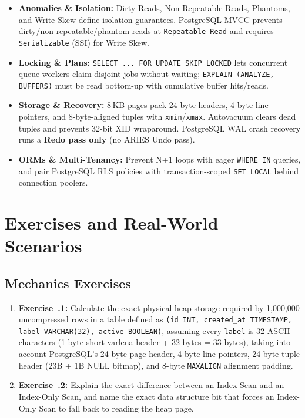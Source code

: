\begin{itemize}[leftmargin=15pt]
  \item \textbf{Anomalies \& Isolation:} Dirty Reads, Non-Repeatable Reads, Phantoms, and Write Skew define isolation guarantees. PostgreSQL MVCC prevents dirty/non-repeatable/phantom reads at \texttt{Repeatable Read} and requires \texttt{Serializable} (SSI) for Write Skew.
  \item \textbf{Locking \& Plans:} \texttt{SELECT ... FOR UPDATE SKIP LOCKED} lets concurrent queue workers claim disjoint jobs without waiting; \texttt{EXPLAIN (ANALYZE, BUFFERS)} must be read bottom-up with cumulative buffer hits/reads.
  \item \textbf{Storage \& Recovery:} 8\,KB pages pack 24-byte headers, 4-byte line pointers, and 8-byte-aligned tuples with \texttt{xmin}/\texttt{xmax}. Autovacuum clears dead tuples and prevents 32-bit XID wraparound. PostgreSQL WAL crash recovery runs a \textbf{Redo pass only} (no ARIES Undo pass).
  \item \textbf{ORMs \& Multi-Tenancy:} Prevent N+1 loops with eager \texttt{WHERE IN} queries, and pair PostgreSQL RLS policies with transaction-scoped \texttt{SET LOCAL} behind connection poolers.
\end{itemize}

\section{Exercises and Real-World Scenarios}

\subsection{Mechanics Exercises}
\begin{enumerate}[leftmargin=15pt]
  \item \textbf{Exercise~\thechapter.1:} Calculate the exact physical heap storage required by 1,000,000 uncompressed rows in a table defined as \texttt{(id INT, created\_at TIMESTAMP, label VARCHAR(32), active BOOLEAN)}, assuming every \texttt{label} is 32 ASCII characters (1-byte short varlena header + 32 bytes = 33 bytes), taking into account PostgreSQL's 24-byte page header, 4-byte line pointers, 24-byte tuple header (23B + 1B NULL bitmap), and 8-byte \texttt{MAXALIGN} alignment padding.
  \item \textbf{Exercise~\thechapter.2:} Explain the exact difference between an Index Scan and an Index-Only Scan, and name the exact data structure bit that forces an Index-Only Scan to fall back to reading the heap page.
\end{enumerate}

